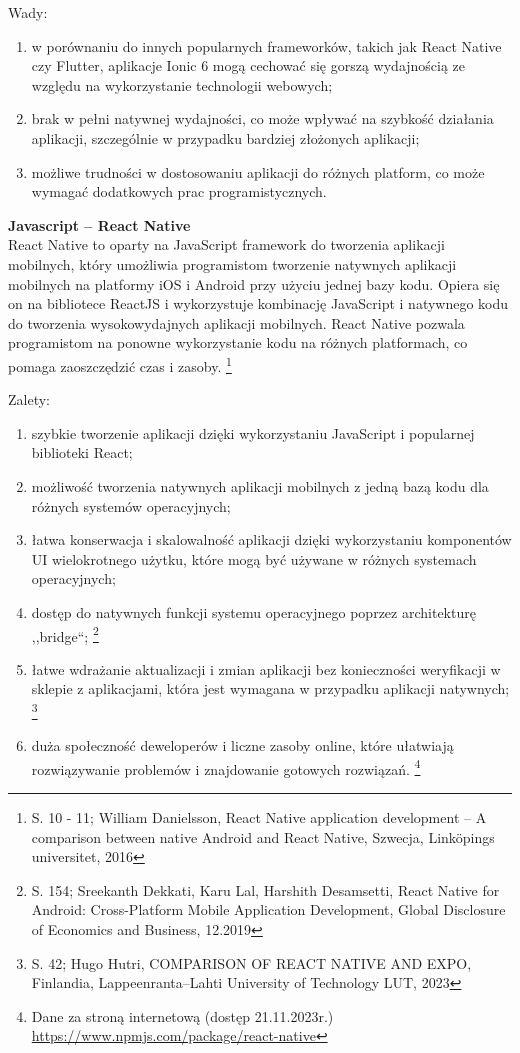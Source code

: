 \documentclass[12pt, a4paper, twoside, openany]{book}
\begin{document}
Wady:
\begin{enumerate}[label=--]
    \item w porównaniu do innych popularnych frameworków, takich jak React Native czy Flutter, aplikacje Ionic 6 mogą cechować się gorszą wydajnością ze względu na wykorzystanie technologii webowych;
    \item brak w pełni natywnej wydajności, co może wpływać na szybkość działania aplikacji, szczególnie w przypadku bardziej złożonych aplikacji;
    \item możliwe trudności w dostosowaniu aplikacji do różnych platform, co może wymagać dodatkowych prac programistycznych.
\end{enumerate}

\textbf{Javascript -- React Native\\}
\indent React Native to oparty na JavaScript framework do tworzenia aplikacji mobilnych, który umożliwia programistom tworzenie natywnych aplikacji mobilnych na platformy iOS i Android przy użyciu jednej bazy kodu.
Opiera się on na bibliotece ReactJS i wykorzystuje kombinację JavaScript i natywnego kodu do tworzenia wysokowydajnych aplikacji mobilnych.
React Native pozwala programistom na ponowne wykorzystanie kodu na różnych platformach, co pomaga zaoszczędzić czas i zasoby. \footnote{S. 10 - 11; William Danielsson, React Native application development – A comparison between native Android and React Native, Szwecja, Linköpings universitet, 2016}

Zalety:
\begin{enumerate}[label=--]
    \item szybkie tworzenie aplikacji dzięki wykorzystaniu JavaScript i popularnej biblioteki React;
    \item możliwość tworzenia natywnych aplikacji mobilnych z jedną bazą kodu dla różnych systemów operacyjnych;
    \item łatwa konserwacja i skalowalność aplikacji dzięki wykorzystaniu komponentów UI wielokrotnego użytku, które mogą być używane w różnych systemach operacyjnych;
    \item dostęp do natywnych funkcji systemu operacyjnego poprzez architekturę ,,bridge``; \footnote{S. 154; Sreekanth Dekkati, Karu Lal, Harshith Desamsetti, React Native for Android: Cross-Platform Mobile Application Development, Global Disclosure of Economics and Business, 12.2019}
    \item łatwe wdrażanie aktualizacji i zmian aplikacji bez konieczności weryfikacji w sklepie z aplikacjami, która jest wymagana w przypadku aplikacji natywnych; \footnote{S. 42; Hugo Hutri, COMPARISON OF REACT NATIVE AND EXPO, Finlandia, Lappeenranta–Lahti University of Technology LUT, 2023}
    \item duża społeczność deweloperów i liczne zasoby online, które ułatwiają rozwiązywanie problemów i znajdowanie gotowych rozwiązań. \footnote{Dane za stroną internetową (dostęp 21.11.2023r.) \url{https://www.npmjs.com/package/react-native}}
\end{enumerate}
\end{document}
